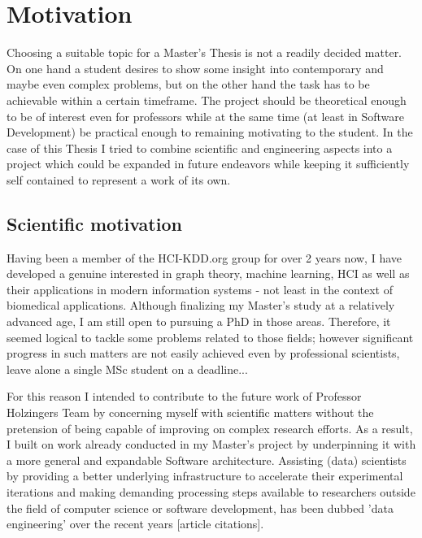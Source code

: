\chapter{Motivation}
\label{ch:motivation}

Choosing a suitable topic for a Master's Thesis is not a readily decided matter. On one hand a student desires to show some insight into contemporary and maybe even complex problems, but on the other hand the task has to be achievable within a certain timeframe. The project should be theoretical enough to be of interest even for professors while at the same time (at least in Software Development) be practical enough to remaining motivating to the student. In the case of this Thesis I tried to combine scientific and engineering aspects into a project which could be expanded in future endeavors while keeping it sufficiently self contained to represent a work of its own.


\section{Scientific motivation}
\label{sect:scientific_motivation}

Having been a member of the HCI-KDD.org group for over 2 years now, I have developed a genuine interested in graph theory, machine learning, HCI as well as their applications in modern information systems - not least in the context of biomedical applications. Although finalizing my Master's study at a relatively advanced age, I am still open to pursuing a PhD in those areas. Therefore, it seemed logical to tackle some problems related to those fields; however significant progress in such matters are not easily achieved even by professional scientists, leave alone a single MSc student on a deadline...

For this reason I intended to contribute to the future work of Professor Holzingers Team by concerning myself with scientific matters without the pretension of being capable of improving on complex research efforts. As a result, I built on work already conducted in my Master's project by underpinning it with a more general and expandable Software architecture. Assisting (data) scientists by providing a better underlying infrastructure to accelerate their experimental iterations and making demanding processing steps available to researchers outside the field of computer science or software development, has been dubbed 'data engineering' over the recent years [article citations]. 

